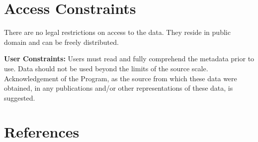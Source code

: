 \documentclass[
  letterpaper,
  oneside,
  open=any]{scrbook}
\newlength{\cslhangindent}
\newenvironment{CSLReferences}[2] %
 {\begin{list}{}{%
  \setlength{\itemindent}{0pt}
  \setlength{\leftmargin}{0pt}
  \setlength{\parsep}{0pt}
  \ifodd #1
   \setlength{\leftmargin}{\cslhangindent}
   \setlength{\itemindent}{-1\cslhangindent}
  \fi
  \setlength{\itemsep}{#2\baselineskip}}}
 {\end{list}}
\begin{document}
\chapter{Access Constraints}\label{access-constraints-1}

There are no legal restrictions on access to the data. They reside in
public domain and can be freely distributed.

\textbf{User Constraints:} Users must read and fully comprehend the
metadata prior to use. Data should not be used beyond the limits of the
source scale. Acknowledgement of the Program, as the source from which
these data were obtained, in any publications and/or other
representations of these data, is suggested.

\chapter{References}\label{references}

\label{refs}
\begin{CSLReferences}{0}{1}
\end{CSLReferences}


\backmatter
\end{document}
